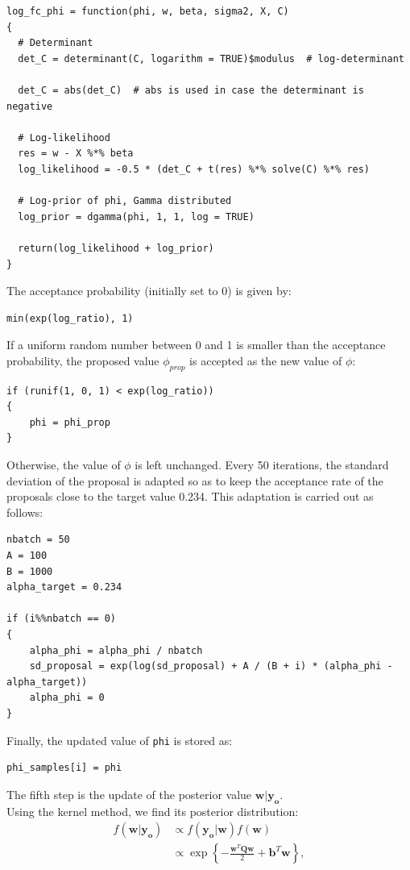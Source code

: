 \documentclass[a4paper,12pt]{article}
\begin{document}
\begin{lstlisting}[style=R]
log_fc_phi = function(phi, w, beta, sigma2, X, C)
{
  # Determinant
  det_C = determinant(C, logarithm = TRUE)$modulus  # log-determinant

  det_C = abs(det_C)  # abs is used in case the determinant is negative

  # Log-likelihood
  res = w - X %*% beta
  log_likelihood = -0.5 * (det_C + t(res) %*% solve(C) %*% res)

  # Log-prior of phi, Gamma distributed
  log_prior = dgamma(phi, 1, 1, log = TRUE)

  return(log_likelihood + log_prior)
}
\end{lstlisting}
The acceptance probability (initially set to 0) is given by:
\begin{lstlisting}[style=R]
min(exp(log_ratio), 1)
\end{lstlisting}
If a uniform random number between 0 and 1 is smaller than the acceptance probability, the proposed value \(\phi_{prop}\) is accepted as the new value of \(\phi\):
\begin{lstlisting}[style=R]
if (runif(1, 0, 1) < exp(log_ratio))
{
    phi = phi_prop
}
\end{lstlisting}
Otherwise, the value of \(\phi\) is left unchanged. Every 50 iterations, the standard deviation of the proposal is adapted so as to keep the acceptance rate of the proposals close to the target value 0.234. This adaptation is carried out as follows:
\begin{lstlisting}[style=R]
nbatch = 50
A = 100
B = 1000
alpha_target = 0.234

if (i%%nbatch == 0)
{
    alpha_phi = alpha_phi / nbatch
    sd_proposal = exp(log(sd_proposal) + A / (B + i) * (alpha_phi - alpha_target))
    alpha_phi = 0
}
\end{lstlisting}
Finally, the updated value of \texttt{phi} is stored as:
\begin{lstlisting}[style=R]
phi_samples[i] = phi
\end{lstlisting}
The fifth step is the update of the posterior value \(\mathbf{w}|\mathbf{y_o}\). \\
Using the kernel method, we find its posterior distribution:
\begin{align*}
    f(\mathbf{w}|\mathbf{y_o}) &\propto f(\mathbf{y_o}|\mathbf{w})f(\mathbf{w}) \\
    &\propto \exp{\left\{ - \frac{\mathbf{w}^T\mathbf{Q}\mathbf{w}}{2} + \mathbf{b}^T \mathbf{w}\right\}},
\end{align*}
\end{document}
